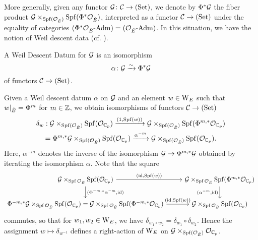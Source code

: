 \documentclass[../main.tex]{subfiles}
\begin{document}
More generally, given any functor $\mathcal{G} \colon \mathcal{C} \to {(\mathrm{Set})}$, we denote by
$\Phi^* \mathcal{G}$ the fiber product $\mathcal{G} \times_{\operatorname{Spf}(\mathcal{O}_{\breve {E}})} \operatorname{Spf}(\Phi^*
\mathcal{O}_{\breve {E}})$, interpreted as a functor $\mathcal{C} \to {(\mathrm{Set})}$ under the
equality of categories ${({\Phi^*\mathcal{O}_{\breve {E}}}\text-\allowbreak\mathrm{Adm})} = {({\mathcal{O}_{\breve {E}}}\text-\allowbreak\mathrm{Adm})}$. In
this situation, we have the notion of Weil descent data
(cf. \cite[Definition 3.45]{rapoport1996period}).

\begin{defi}\label{def:WeilDescentDatum}
  A Weil Descent Datum for $\mathcal{G}$ is an isomorphism
  \begin{equation*}
    \alpha \colon \mathcal{G} \xrightarrow{\sim} \Phi^* \mathcal{G}
  \end{equation*}
  of functors $\mathcal{C} \to {(\mathrm{Set})}$.
\end{defi}

Given a Weil descent datum $\alpha$ on $\mathcal{G}$ and an element $w \in \mathrm W_E$
such that $w|_{{\breve {E}}} = \Phi^m$ for $m \in \mathbb{Z}$, we obtain isomorphisms
of functors $\mathcal{C} \to {(\mathrm{Set})}$
\begin{multline}\label{eq:ActionFromWeilDD}
  \delta_w: \mathcal{G} \times_{\operatorname{Spf}(\mathcal{O}_{\breve {E}})} \operatorname{Spf}(\mathcal{O}_{\mathbb{C}_p}) \xrightarrow{(1, \operatorname{Spf}(w))} 
  \mathcal{G} \times_{\operatorname{Spf}(\mathcal{O}_{\breve {E}})} \operatorname{Spf}(\Phi^{m,*}\mathcal{O}_{\mathbb{C}_p}) \\
  = \Phi^{m, *} \mathcal{G} \times_{\operatorname{Spf}(\mathcal{O}_{\breve {E}})} \operatorname{Spf}(\mathcal{O}_{\mathbb{C}_p})
  \xrightarrow{\alpha^{-m}} \mathcal{G} \times_{\operatorname{Spf}(\mathcal{O}_{\breve {E}})} \operatorname{Spf}(\mathcal{O}_{\mathbb{C}_p}).
\end{multline}
Here, $\alpha^{-m}$ denotes the inverse of the isomorphism $\mathcal{G} \to \Phi^{m, *}
\mathcal{G}$ obtained by iterating the isomorphism $\alpha$. Note that the square 
\begin{equation*}
  \begin{tikzcd}[ampersand replacement=\&]
    {\cG \times_{\spf \cO_\br E} \spf(\cO_{\C_p})} \& {\cG \times_{\spf \cO_\br
    E} \spf(\Phi^{m, *}\cO_{\C_p})} \\
  	{\Phi^{-m,*}\cG \times_{\spf \cO_\br E} \spf( \cO_{\C_p})} 
    = {\cG \times_{\spf \cO_\br E} \spf(\Phi^{-m,*}\cO_{\C_p})}
    \& {\cG \times_{\spf \cO_\br E} \spf(  \cO_{\C_p})}
  	\arrow["{(\id, \spf(w))}", from=1-1, to=1-2]
    \arrow["{(\Phi^{-m, *}\alpha^{-m}, \id)}", from=1-1, to=2-1]
    \arrow["{(\alpha^{-m}, \id)}"', from=1-2, to=2-2]
  	\arrow["{(\id, \spf(w))}", from=2-1, to=2-2]
  \end{tikzcd}
\end{equation*}
commutes, so that for $w_1, w_2 \in \mathrm W_E$, we have $\delta_{w_1 \circ w_2}
= \delta_{w_1} \circ \delta_{w_2}$.
Hence the assignment $w \mapsto \delta_{w^{-1}}$ defines a right-action of 
$\mathrm W_E$ on $\mathcal{G} \times_{\operatorname{Spf}(\mathcal{O}_{{\breve {E}}})} \mathcal{O}_{\mathbb{C}_p}$. 
\end{document}
